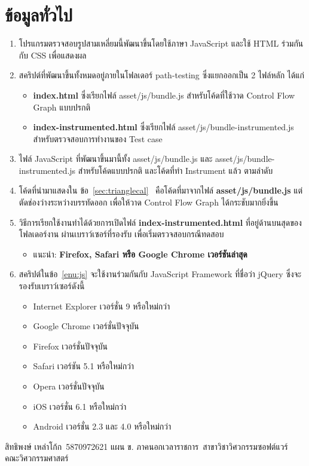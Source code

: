 \documentclass[12pt,a4paper]{article}
\newcommand{\sitdhibong}{สิทธิพงษ์ เหล่าโก้ก}
\newcommand{\studentid}{5870972621}
\newcommand{\department}{สาขาวิชาวิศวกรรมซอฟต์แวร์}
\newcommand{\faculty}{คณะวิศวกรรมศาสตร์}
\newcommand{\myprogram}{แผน ข. ภาคนอกเวลาราชการ}
\newcommand{\numbername}{ข้อ}
\begin{document}
    \section{ข้อมูลทั่วไป}
    \label{sec:general}
    \begin{enumerate}
        \item โปรแกรมตรวจสอบรูปสามเหลี่ยมนี้พัฒนาขึ้นโดยใช้ภาษา JavaScript และใช้ HTML ร่วมกันกับ CSS เพื่อแสดงผล
        \item สคริปต์ที่พัฒนาขึ้นทั้งหมดอยู่ภายในโฟลเดอร์ path-testing ซึ่งแยกออกเป็น 2 ไฟล์หลัก ได้แก่
            \begin{itemize}
                \item {\bf index.html} ซึ่งเรียกไฟล์ asset/js/bundle.js สำหรับโค้ดที่ใช้วาด Control Flow Graph แบบปรกติ
                \item {\bf index-instrumented.html} ซึ่งเรียกไฟล์ asset/js/bundle-instrumented.js สำหรับตรวจสอบการทำงานของ Test case
            \end{itemize}
        \item ไฟล์ JavaScript ที่พัฒนาขึ้นมานี้ทั้ง asset/js/bundle.js และ asset/js/bundle-instrumented.js สำหรับโค้ดแบบปรกติ และโค้ดที่ทำ Instrument แล้ว ตามลำดับ \label{enu:js}
        \item โค้ดที่นำมาแสดงใน \numbername~\ref{sec:trianglecal}~{\bf {}} คือโค้ดที่มาจากไฟล์ {\bf asset/js/bundle.js} แต่ตัดช่องว่างระหว่างบรรทัดออก เพื่อให้วาด Control Flow Graph ได้กระชับมากยิ่งขึ้น
        \item วิธีการเรียกใช้งานทำได้ด้วยการเปิดไฟล์ {\bf index-instrumented.html} ที่อยู่ด้านบนสุดของโฟลเดอร์งาน ผ่านเบราว์เซอร์ที่รองรับ เพื่อเริ่มตรวจสอบกรณีทดสอบ
            \begin{itemize}
                \item แนะนำ: {\bf Firefox, Safari หรือ Google Chrome เวอร์ชันล่าสุด}
            \end{itemize}
        \item สคริปต์ในข้อ~\ref{enu:js} จะใช้งานร่วมกันกับ JavaScript Framework ที่ชื่อว่า jQuery ซึ่งจะรองรับเบราว์เซอร์ดังนี้
            \begin{itemize}
                \item Internet Explorer เวอร์ชั่น 9 หรือใหม่กว่า
                \item Google Chrome เวอร์ชั่นปัจจุบัน
                \item Firefox เวอร์ชั่นปัจจุบัน
                \item Safari เวอร์ชัน 5.1 หรือใหม่กว่า 
                \item Opera เวอร์ชั่นปัจจุบัน 
                \item iOS เวอร์ชั่น 6.1 หรือใหม่กว่า
                \item Android เวอร์ชั่น 2.3 และ 4.0 หรือใหม่กว่า
            \end{itemize}
    \end{enumerate}
    \vfill
    \noindent\sitdhibong\, \studentid \newline
    \myprogram\, \newline
    \department\, \faculty
\end{document}
